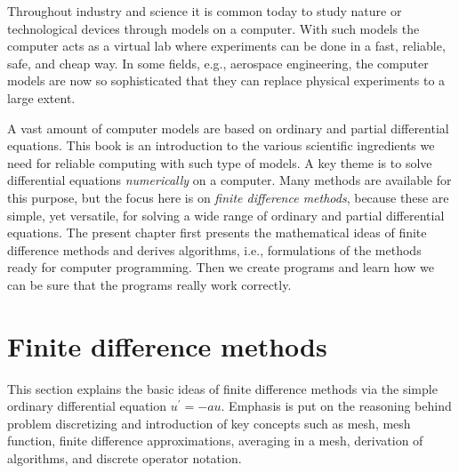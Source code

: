\documentclass[%
oneside,                 %
final,                   %
10pt]{article}
\begin{document}
\vspace{1cm} %








Throughout industry and science it is common today to study nature or
technological devices through models on a computer. With such models
the computer acts as a virtual lab where experiments can be done
in a fast, reliable, safe, and cheap way. In some fields, e.g., aerospace
engineering, the computer models are now so sophisticated that they
can replace physical experiments to a large extent.


A vast amount of computer models are based on ordinary and partial
differential equations. This book is an introduction to the
various scientific ingredients we need for reliable computing with such
type of models. A key theme is to solve differential equations
\emph{numerically} on a computer. Many methods are available for this purpose,
but the focus here is on \emph{finite difference methods}, because these
are simple, yet versatile, for solving a wide range of ordinary and
partial differential equations. The present chapter first presents the
mathematical ideas of finite difference methods and derives algorithms,
i.e., formulations of the methods ready for computer programming.
Then we create programs and learn how we can be sure that the programs
really work correctly.


\section{Finite difference methods}

\label{decay:basics}

This section explains the basic ideas of finite difference methods
via the simple ordinary differential equation $u^{\prime}=-au$.
Emphasis is put on the reasoning behind problem discretizing and
introduction of key concepts such as mesh, mesh function,
finite difference approximations, averaging in a mesh,
derivation of algorithms, and discrete operator notation.
\end{document}
